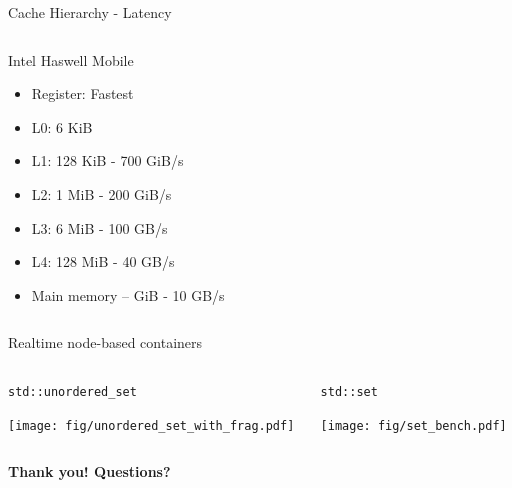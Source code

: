 \documentclass[10pt,aspectratio=169]{beamer}
\begin{document}
\begin{frame}{Cache Hierarchy - Latency}{}
    \begin{columns}
        \begin{column}{0.4\textwidth}
            Intel Haswell Mobile 
            \begin{itemize}
                \item Register: Fastest
                \item L0: 6 KiB
                \item L1: 128 KiB - 700 GiB/s
                \item L2: 1 MiB - 200 GiB/s
                \item L3: 6 MiB - 100 GB/s
                \item L4: 128 MiB - 40 GB/s
                \item Main memory – GiB - 10 GB/s
            \end{itemize}
        \end{column}

    \end{columns}
\end{frame}

\begin{frame}{Realtime node-based containers}
    \begin{columns}
        \begin{column}{0.5\textwidth}
            \texttt{std::unordered\_set}
            \begin{center}
                \texttt{[image: fig/unordered\_set\_with\_frag.pdf]} \\
            \end{center}
        \end{column}

        \begin{column}{0.5\textwidth}
            \texttt{std::set}
            \begin{center}
                \texttt{[image: fig/set\_bench.pdf]} \\
            \end{center}
        \end{column}
    \end{columns}
\end{frame}

\begin{frame}{}
    \vspace{1cm}
    \begin{center}
        {\Large \bf Thank you! Questions?} 
    \end{center}
\end{frame}
\end{document}
